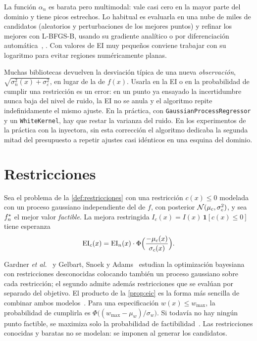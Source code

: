 La función $\alpha_n$ es barata pero multimodal: vale casi cero en la mayor parte del dominio y tiene picos estrechos. Lo habitual es evaluarla en una nube de miles de candidatos (aleatorios y perturbaciones de los mejores puntos) y refinar los mejores con L-BFGS-B, usando su gradiente analítico o por diferenciación automática~\cite[§9.2]{garnett}, \cite{botorch}. Con valores de EI muy pequeños conviene trabajar con su logaritmo para evitar regiones numéricamente planas.

\begin{observacion}\label{obs:latente}
Muchas bibliotecas devuelven la desviación típica de una nueva \emph{observación}, $\sqrt{\sigma_n^2(x)+\sigma_\varepsilon^2}$, en lugar de la de $f(x)$. Usarla en la EI o en la probabilidad de cumplir una restricción es un error: en un punto ya ensayado la incertidumbre nunca baja del nivel de ruido, la EI no se anula y el algoritmo repite indefinidamente el mismo ajuste. En la práctica, con \texttt{GaussianProcessRegressor} y un \texttt{WhiteKernel}, hay que restar la varianza del ruido. En los experimentos de la práctica con la inyectora, sin esta corrección el algoritmo dedicaba la segunda mitad del presupuesto a repetir ajustes casi idénticos en una esquina del dominio.
\end{observacion}

\section{Restricciones}

\begin{proposicion}\label{prop:eic}
Sea el problema de la \cref{def:restricciones} con una restricción $c(x)\le 0$ modelada con un proceso gaussiano independiente del de $f$, con posterior $\mathcal{N}(\mu_c,\sigma_c^2)$, y sea $f^{*}_{n}$ el mejor valor \emph{factible}. La mejora restringida $I_c(x)=I(x)\,\mathbf 1[c(x)\le 0]$ tiene esperanza
\[
\operatorname{EI}_c(x)=\operatorname{EI}_n(x)\cdot\Phi\Bigl(\frac{-\mu_c(x)}{\sigma_c(x)}\Bigr).
\]
\end{proposicion}

Gardner \emph{et al.}~\cite{gardner} y Gelbart, Snoek y Adams~\cite{gelbart} estudian la optimización bayesiana con restricciones desconocidas colocando también un proceso gaussiano sobre cada restricción; el segundo admite además restricciones que se evalúan por separado del objetivo. El producto de la \cref{prop:eic} es la forma más sencilla de combinar ambos modelos~\cite[§11.2]{garnett}. Para una especificación $w(x)\le w_{\max}$, la probabilidad de cumplirla es $\Phi\bigl((w_{\max}-\mu_w)/\sigma_w\bigr)$. Si todavía no hay ningún punto factible, se maximiza solo la probabilidad de factibilidad~\cite[§11.2]{garnett}. Las restricciones conocidas y baratas no se modelan: se imponen al generar los candidatos.

